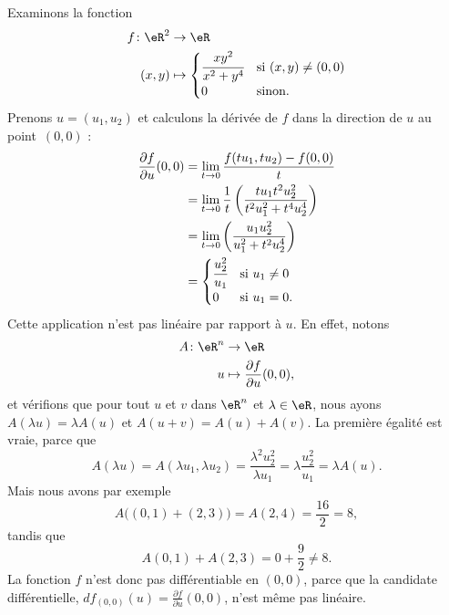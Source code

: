 \begin{example}     \label{Exemple0046Diff}
	Examinons la fonction
	\begin{equation}
		\begin{aligned}
			f\colon \eR^2 & \to \eR                                   \\
			(x,y)         & \mapsto \begin{cases}
				\cfrac{ xy^2 }{ x^2+y^4 } & \text{si }(x,y)\neq (0,0) \\
				0                        & \text{sinon}.
			\end{cases}
		\end{aligned}
	\end{equation}
	Prenons \( u=(u_1,u_2)\) et calculons la dérivée de \( f\) dans la direction de \( u\) au point~\( (0,0)\) :
	\begin{equation}
		\begin{aligned}[]
			\frac{ \partial f }{ \partial u }(0,0)
			 & =\lim_{t\to 0}\frac{ f(tu_1,tu_2)-f(0,0) }{ t }                                      \\
			 & =\lim_{t\to 0}\frac{1}{ t }\left( \frac{ tu_1t^2u_2^2 }{ t^2u_1^2+t^4u_2^4 } \right) \\
			 & =\lim_{t\to 0}\left( \frac{ u_1u_2^2 }{ u_1^2+t^2u_2^4 } \right)                     \\
			 & =\begin{cases}
				\cfrac{ u_2^2 }{ u_1 }  & \text{si }u_1\neq 0         \\
				0                       & \text{si }u_1=0.
			\end{cases}
		\end{aligned}
	\end{equation}
	Cette application n'est pas linéaire par rapport à \( u\). En effet, notons
	\begin{equation}
		\begin{aligned}
			A\colon \eR^n & \to \eR                                         \\
			u             & \mapsto \frac{ \partial f }{ \partial u }(0,0),
		\end{aligned}
	\end{equation}
	et vérifions que pour tout \( u\) et \( v\) dans \( \eR^n\) et \( \lambda\in\eR\), nous ayons \( A(\lambda u)=\lambda A(u)\) et \( A(u+v)=A(u)+A(v)\). La première égalité est vraie, parce que
	\begin{equation}
		A(\lambda u)=A(\lambda u_1,\lambda u_2)=\frac{ \lambda^2 u_2^2 }{ \lambda u_1 }=\lambda\frac{ u_2^2 }{ u_1 }=\lambda A(u).
	\end{equation}
	Mais nous avons par exemple
	\begin{equation}
		A\big( (0,1)+(2,3) \big)=A(2,4)=\frac{ 16 }{ 2 }=8,
	\end{equation}
	tandis que
	\begin{equation}
		A(0,1)+A(2,3)=0+\frac{ 9 }{ 2 }\neq 8.
	\end{equation}
	La fonction \( f\) n'est donc pas différentiable en \( (0,0)\), parce que la candidate différentielle, \( df_{(0,0)}(u)=\frac{ \partial f }{ \partial u }(0,0)\), n'est même pas linéaire.

\end{example}

